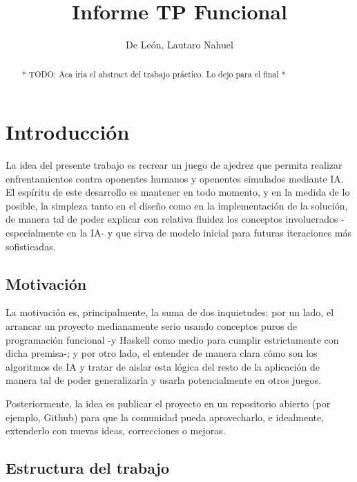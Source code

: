 \documentclass{llncs}
\begin{document}
%
\frontmatter
%
\pagestyle{headings}

\title{Informe TP Funcional}
%
%
\author{De León, Lautaro Nahuel}
%
%
\maketitle

\begin{abstract}
* TODO: Aca iria el abstract del trabajo práctico. Lo dejo para el final *
\end{abstract}
%
\section{Introducción}
%

La idea del presente trabajo es recrear un juego de ajedrez que permita realizar enfrentamientos contra oponentes humanos y openentes simulados mediante IA. El espíritu de este desarrollo es mantener en todo momento, y en la medida de lo posible, la simpleza tanto en el diseño como en la implementación de la solución, de manera tal de poder explicar con relativa fluidez los conceptos involucrados -especialmente en la IA- y que sirva de modelo inicial para futuras iteraciones más sofisticadas.

\subsection{Motivación}
\label{subsec:Motivacion}

La motivación es, principalmente, la suma de dos inquietudes: por un lado, el arrancar un proyecto medianamente serio usando conceptos puros de programación funcional -y Haskell como medio para cumplir estrictamente con dicha premisa-; y por otro lado, el entender de manera clara cómo son los algoritmos de IA y tratar de aislar esta lógica del resto de la aplicación de manera tal de poder generalizarla y usarla potencialmente en otros juegos.

Posteriormente, la idea es publicar el proyecto en un repositorio abierto (por ejemplo, Github) para que la comunidad pueda aprovecharlo, e idealmente, extenderlo con nuevas ideas, correcciones o mejoras.

\subsection{Estructura del trabajo}
\label{subsec:Estructura trabajo}
\end{document}
